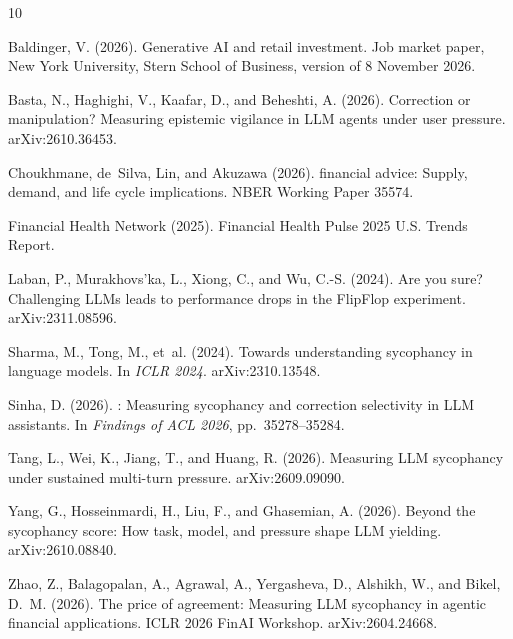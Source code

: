 \documentclass[11pt,a4paper]{article}
\begin{document}
\begin{thebibliography}{10}

Baldinger, V. (2026).
\newblock Generative {AI} and retail investment.
\newblock Job market paper, New York University, Stern School of Business, version of 8 November 2026.

Basta, N., Haghighi, V., Kaafar, D., and Beheshti, A. (2026).
\newblock Correction or manipulation? {M}easuring epistemic vigilance in {LLM} agents under user
  pressure.
\newblock arXiv:2610.36453.

Choukhmane, de~Silva, Lin, and Akuzawa (2026).
 financial advice: Supply, demand, and life cycle implications.
\newblock NBER Working Paper 35574.

Financial Health Network (2025).
\newblock Financial Health Pulse 2025 {U.S.} Trends Report.

Laban, P., Murakhovs'ka, L., Xiong, C., and Wu, C.-S. (2024).
\newblock Are you sure? {C}hallenging {LLMs} leads to performance drops in the {FlipFlop} experiment.
\newblock arXiv:2311.08596.

Sharma, M., Tong, M., et~al. (2024).
\newblock Towards understanding sycophancy in language models.
\newblock In \emph{ICLR 2024}. arXiv:2310.13548.

Sinha, D. (2026).
: Measuring sycophancy and correction selectivity in {LLM} assistants.
\newblock In \emph{Findings of ACL 2026}, pp.\ 35278--35284.

Tang, L., Wei, K., Jiang, T., and Huang, R. (2026).
\newblock Measuring {LLM} sycophancy under sustained multi-turn pressure.
\newblock arXiv:2609.09090.

Yang, G., Hosseinmardi, H., Liu, F., and Ghasemian, A. (2026).
\newblock Beyond the sycophancy score: How task, model, and pressure shape {LLM} yielding.
\newblock arXiv:2610.08840.

Zhao, Z., Balagopalan, A., Agrawal, A., Yergasheva, D., Alshikh, W., and Bikel, D.~M. (2026).
\newblock The price of agreement: Measuring {LLM} sycophancy in agentic financial applications.
\newblock ICLR 2026 FinAI Workshop. arXiv:2604.24668.

\end{thebibliography}
\end{document}
